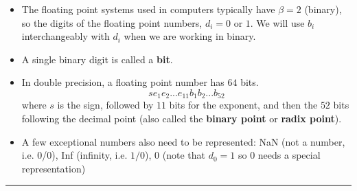\documentclass[12pt,letterpaper,noanswers]{exam}
\begin{document}
\begin{tcolorbox}
\begin{itemize}
\itemsep0pt
    \item The floating point systems used in computers typically have $\beta = 2$ (binary), so the digits of the floating point numbers, $d_i = 0$ or $1$.  We will use $b_i$ interchangeably with $d_i$ when we are working in binary.
    \item A single binary digit is called a \textbf{bit}.
    \item In double precision, a floating point number has $64$ bits.  \[s e_1e_2...e_{11}b_1b_2...b_{52}\] where $s$ is the sign, followed by $11$ bits for the exponent, and then the $52$ bits following the decimal point (also called the \textbf{binary point} or \textbf{radix point}).
    \item A few exceptional numbers also need to be represented: NaN (not a number, i.e. 0/0), Inf (infinity, i.e. $1/0$), 0 (note that $d_0 = 1$ so $0$ needs a special representation)
\end{itemize}
\end{tcolorbox}

\vspace{0.2cm}
\hrule
\vspace{0.2cm}


    
    
    
    
    
    
    
    
    
    
    
\end{document}
